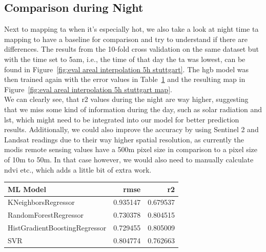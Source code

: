 \subsection{Comparison during Night}

Next to mapping \gls{ta} when it's especially hot, we also take a look at night time \gls{ta} mapping to have a baseline for comparison and try to understand if there are differences. The results from the 10-fold cross validation on the same dataset but with the time set to 5am, i.e., the time of that day the \gls{ta} was lowest, can be found in Figure~\ref{fig:eval areal interpolation 5h stuttgart}. The \gls{hgb} model was then trained again with the error values in Table~\ref{tab: eval night time 5h stuttgart} and the resulting map in Figure~\ref{fig:eval areal interpolation 5h stuttgart map}.\\
We can clearly see, that \gls{r2} values during the night are way higher, suggesting that we miss some kind of information during the day, such as solar radiation and \gls{lst}, which might need to be integrated into our model for better prediction results. Additionally, we could also improve the accuracy by using Sentinel 2 and Landsat readings due to their way higher spatial resolution, as currently the \gls{modis} remote sensing values have a 500m pixel size in comparison to a pixel size of 10m to 50m. In that case however, we would also need to manually calculate \gls{ndvi} etc., which adds a little bit of extra work.

\begin{table}[ht]
  \centering
  \begin{tabular}{lrr}
  \toprule
                      ML Model &     \gls{rmse} &       \gls{r2} \\
  \midrule
            KNeighborsRegressor & 0.935147 & 0.679537 \\
          RandomForestRegressor & 0.730378 & 0.804515 \\
  HistGradientBoostingRegressor & 0.729455 & 0.805009 \\
                            SVR & 0.804774 & 0.762663 \\
  \bottomrule
  \end{tabular}
  \label{tab: eval night time 5h stuttgart}
\end{table}


